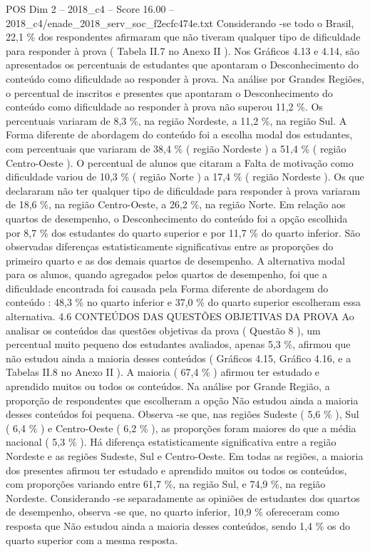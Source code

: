 \begin{textsample}{POS Dim 2 – 2018\_c4 – Score 16.00 – 2018\_c4/enade\_2018\_serv\_soc\_f2ecfc474e.txt}
Considerando -se todo o Brasil, 22,1 \% dos respondentes afirmaram que não tiveram qualquer tipo de dificuldade para responder à prova ( Tabela II.7 no Anexo II ).
Nos Gráficos 4.13 e 4.14, são apresentados os percentuais de estudantes que apontaram o Desconhecimento do conteúdo como dificuldade ao responder à prova.
Na análise por Grandes Regiões, o percentual de inscritos e presentes que apontaram o Desconhecimento do conteúdo como dificuldade ao responder à prova não superou 11,2 \%.
Os percentuais variaram de 8,3 \%, na região Nordeste, a 11,2 \%, na região Sul.
A Forma diferente de abordagem do conteúdo foi a escolha modal dos estudantes, com percentuais que variaram de 38,4 \% ( região Nordeste ) a 51,4 \% ( região Centro-Oeste ).
O percentual de alunos que citaram a Falta de motivação como dificuldade variou de 10,3 \% ( região Norte ) a 17,4 \% ( região Nordeste ).
Os que declararam não ter qualquer tipo de dificuldade para responder à prova variaram de 18,6 \%, na região Centro-Oeste, a 26,2 \%, na região Norte.
Em relação aos quartos de desempenho, o Desconhecimento do conteúdo foi a opção escolhida por 8,7 \% dos estudantes do quarto superior e por 11,7 \% do quarto inferior.
São observadas diferenças estatisticamente significativas entre as proporções do primeiro quarto e as dos demais quartos de desempenho.
A alternativa modal para os alunos, quando agregados pelos quartos de desempenho, foi que a dificuldade encontrada foi causada pela Forma diferente de abordagem do conteúdo : 48,3 \% no quarto inferior e 37,0 \% do quarto superior escolheram essa alternativa. 4.6 CONTEÚDOS DAS QUESTÕES OBJETIVAS DA PROVA Ao analisar os conteúdos das questões objetivas da prova ( Questão 8 ), um percentual muito pequeno dos estudantes avaliados, apenas 5,3 \%, afirmou que não estudou ainda a maioria desses conteúdos ( Gráficos 4.15, Gráfico 4.16, e a Tabelas II.8 no Anexo II ).
A maioria ( 67,4 \% ) afirmou ter estudado e aprendido muitos ou todos os conteúdos.
Na análise por Grande Região, a proporção de respondentes que escolheram a opção Não estudou ainda a maioria desses conteúdos foi pequena.
Observa -se que, nas regiões Sudeste ( 5,6 \% ), Sul ( 6,4 \% ) e Centro-Oeste ( 6,2 \% ), as proporções foram maiores do que a média nacional ( 5,3 \% ).
Há diferença estatisticamente significativa entre a região Nordeste e as regiões Sudeste, Sul e Centro-Oeste.
Em todas as regiões, a maioria dos presentes afirmou ter estudado e aprendido muitos ou todos os conteúdos, com proporções variando entre 61,7 \%, na região Sul, e 74,9 \%, na região Nordeste.
Considerando -se separadamente as opiniões de estudantes dos quartos de desempenho, observa -se que, no quarto inferior, 10,9 \% ofereceram como resposta que Não estudou ainda a maioria desses conteúdos, sendo 1,4 \% os do quarto superior com a mesma resposta.

\end{textsample}
